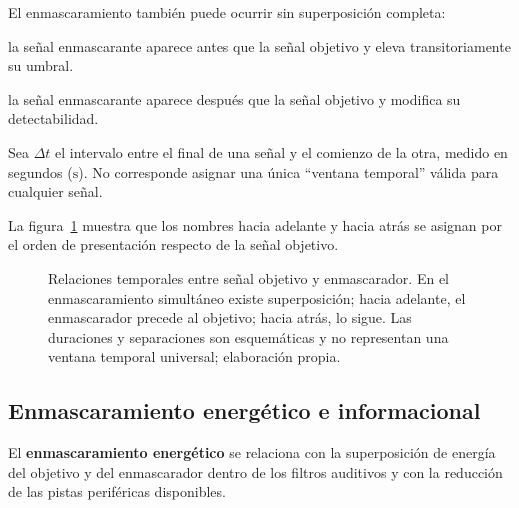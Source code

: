 El enmascaramiento también puede ocurrir sin superposición completa:

\begin{description}[style=nextline]
    \item[\textbf{Enmascaramiento hacia adelante:}]
    la señal enmascarante aparece antes que la señal objetivo y eleva
    transitoriamente su umbral.

    \item[\textbf{Enmascaramiento hacia atrás:}]
    la señal enmascarante aparece después que la señal objetivo y modifica su
    detectabilidad.
\end{description}

Sea \(\Delta t\) el intervalo entre el final de una señal y el comienzo de la
otra, medido en segundos (\(\text{s}\)).  No corresponde asignar una única ``ventana temporal'' válida
para cualquier señal.

La figura~\ref{fig:u7-enmascaramiento-temporal} muestra que los nombres hacia
adelante y hacia atrás se asignan por el orden de presentación respecto de la
señal objetivo.

\begin{figure}[htbp]
    \centering
    
    \caption{Relaciones temporales entre señal objetivo y enmascarador. En el
    enmascaramiento simultáneo existe superposición; hacia adelante, el
    enmascarador precede al objetivo; hacia atrás, lo sigue. Las duraciones y
    separaciones son esquemáticas y no representan una ventana temporal
    universal; elaboración propia.}
    \label{fig:u7-enmascaramiento-temporal}
\end{figure}

\subsection{Enmascaramiento energético e informacional}
\label{sec:u7-enmascaramiento-energetico-informacional}

El \textbf{enmascaramiento energético} se relaciona con la superposición de
energía del objetivo y del enmascarador dentro de los filtros auditivos y con
la reducción de las pistas periféricas disponibles.

